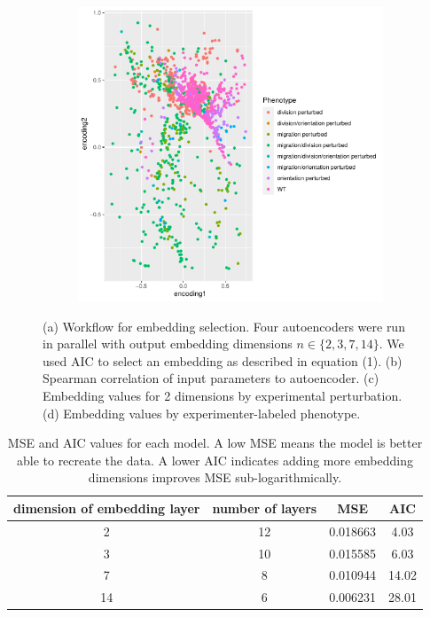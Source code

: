\documentclass{article}
\begin{document}
\begin{figure}
\begin{subfigure}[b]{0.5\textwidth}
         \caption{}
         \label{fig:}
     \end{subfigure}
     \hfill
     \begin{subfigure}[b]{0.5\textwidth}
         \includegraphics[width=\textwidth]{embedding.pheno.pdf}
         \caption{}
         \label{fig:}
     \end{subfigure}
\caption{(a) Workflow for embedding selection. Four autoencoders were run in parallel with output embedding dimensions $n \in \{2,3,7,14\}$. We used AIC to select an embedding as described in equation (1).  
(b) Spearman correlation of input parameters to autoencoder. 
(c) Embedding values for 2 dimensions by experimental perturbation.
(d) Embedding values by experimenter-labeled phenotype.}
\label{fig:}
\end{figure}

\begin{table}
	\centering
\begin{tabular}{|c|c|c|c|}
	\hline
	dimension of embedding layer & number of layers & MSE & AIC \\
	\hline
2 & 12 & 0.018663 & 4.03 \\
3 & 10 & 0.015585 & 6.03 \\
7 & 8 & 0.010944 & 14.02 \\
14 & 6 & 0.006231 & 28.01 \\
\hline
\end{tabular}
\caption{MSE and AIC values for each model. A low MSE means the model is better able to recreate the data. A lower AIC indicates adding more embedding dimensions improves MSE sub-logarithmically.}
\end{table}
\end{document}
